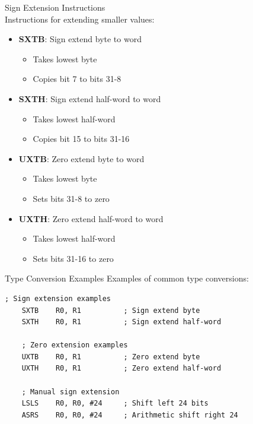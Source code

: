 \begin{concept}{Sign Extension Instructions}\\
Instructions for extending smaller values:
\begin{itemize}
  \item \textbf{SXTB}: Sign extend byte to word
    \begin{itemize}
      \item Takes lowest byte
      \item Copies bit 7 to bits 31-8
    \end{itemize}
  \item \textbf{SXTH}: Sign extend half-word to word
    \begin{itemize}
      \item Takes lowest half-word
      \item Copies bit 15 to bits 31-16
    \end{itemize}
  \item \textbf{UXTB}: Zero extend byte to word
    \begin{itemize}
      \item Takes lowest byte
      \item Sets bits 31-8 to zero
    \end{itemize}
  \item \textbf{UXTH}: Zero extend half-word to word
    \begin{itemize}
      \item Takes lowest half-word
      \item Sets bits 31-16 to zero
    \end{itemize}
\end{itemize}
\end{concept}

\begin{example2}{Type Conversion Examples}
Examples of common type conversions:
\begin{lstlisting}[language=armasm, style=base]
    ; Sign extension examples
    SXTB    R0, R1          ; Sign extend byte
    SXTH    R0, R1          ; Sign extend half-word
    
    ; Zero extension examples
    UXTB    R0, R1          ; Zero extend byte
    UXTH    R0, R1          ; Zero extend half-word
    
    ; Manual sign extension
    LSLS    R0, R0, #24     ; Shift left 24 bits
    ASRS    R0, R0, #24     ; Arithmetic shift right 24
\end{lstlisting}
\end{example2}


